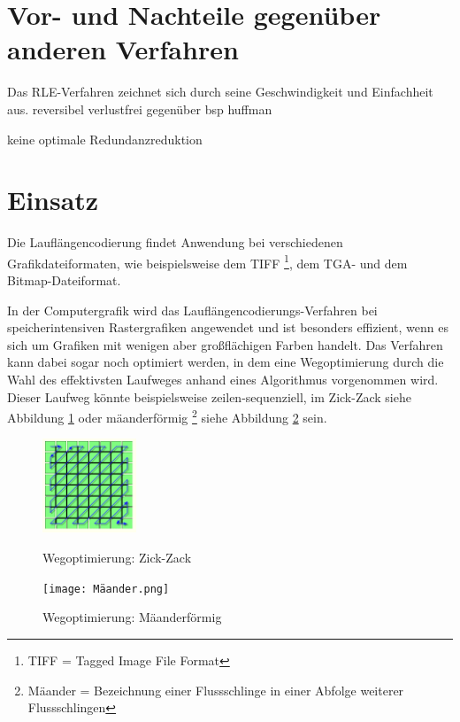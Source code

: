 \documentclass[11pt,a4paper,ngerman]{report}
\begin{document}
		\section{Vor- und Nachteile gegenüber anderen Verfahren}
		Das RLE-Verfahren zeichnet sich durch seine Geschwindigkeit und Einfachheit aus.
		reversibel
		verlustfrei gegenüber bsp huffman
		
		keine optimale Redundanzreduktion
		
		
		
		
		
		\section{Einsatz}
		Die Lauflängencodierung findet Anwendung bei verschiedenen Grafikdateiformaten, wie beispielsweise dem TIFF \footnote{TIFF = Tagged Image File Format}, dem TGA- und dem Bitmap-Dateiformat.
		
		In der Computergrafik wird das Lauflängencodierungs-Verfahren bei speicherintensiven Rastergrafiken angewendet und ist besonders effizient, wenn es sich um Grafiken mit wenigen aber großflächigen Farben handelt. Das Verfahren kann dabei sogar noch optimiert werden, in dem eine Wegoptimierung durch die Wahl des effektivsten Laufweges anhand eines Algorithmus vorgenommen wird.  Dieser Laufweg könnte beispielsweise zeilen-sequenziell, im Zick-Zack siehe Abbildung \ref{zickzack} oder mäanderförmig \footnote{Mäander = Bezeichnung einer Flussschlinge in einer Abfolge weiterer Flussschlingen } siehe Abbildung \ref{mäander} sein.
		
		
		 \begin{figure} [H]
			\begin{center}
				\includegraphics[width=0.25\textwidth]{zickzack.png}
				\caption{Wegoptimierung: Zick-Zack}
				\cite{rostfrank}
				\label{zickzack}
			\end{center}
		\end{figure}
		
		 \begin{figure} [H]
			\begin{center}
				\texttt{[image: Mäander.png]}
				\caption{Wegoptimierung: Mäanderförmig}
				\cite{kocerheiztech}
				\label{mäander}
			\end{center}
		\end{figure}
		
\end{document}
